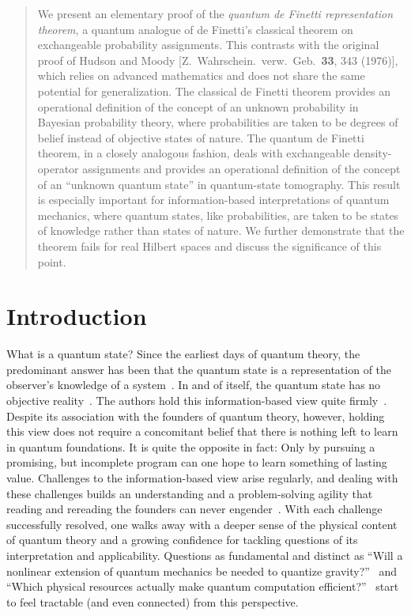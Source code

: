 \begin{abstract}
We present an elementary proof of the {\it quantum de Finetti
representation theorem}, a quantum analogue of de Finetti's
classical theorem on exchangeable probability assignments.  This
contrasts with the original proof of Hudson and Moody [Z.\
Wahrschein.\ verw.\ Geb.\ {\bf 33}, 343 (1976)], which relies on
advanced mathematics and does not share the same potential for
generalization.  The classical de Finetti theorem provides an
operational definition of the concept of an unknown probability in
Bayesian probability theory, where probabilities are taken to be
degrees of belief instead of objective states of nature.  The
quantum de Finetti theorem, in a closely analogous fashion, deals
with exchangeable density-operator assignments and provides an
operational definition of the concept of an ``unknown quantum
state'' in quantum-state tomography.  This result is especially
important for information-based interpretations of quantum
mechanics, where quantum states, like probabilities, are taken to
be states of knowledge rather than states of nature.  We further
demonstrate that the theorem fails for real Hilbert spaces and
discuss the significance of this point.
\end{abstract}


\section{Introduction} \label{sec-intro}

What is a quantum state?  Since the earliest days of quantum theory,
the predominant answer has been that the quantum state is a
representation of the observer's knowledge of a
system~\cite{Bohr1928}.  In and of itself, the quantum state has no
objective reality~\cite{Fuchs2000}.  The authors hold this
information-based view quite firmly~\cite{Caves1996,Caves1997}.
Despite its association with the founders of quantum theory,
however, holding this view does not require a concomitant belief
that there is nothing left to learn in quantum foundations. It is
quite the opposite in fact: Only by pursuing a promising, but
incomplete program can one hope to learn something of lasting value.
Challenges to the information-based view arise regularly, and
dealing with these challenges builds an understanding and a
problem-solving agility that reading and rereading the founders can
never engender~\cite{Faye1994}. With each challenge successfully
resolved, one walks away with a deeper sense of the physical content
of quantum theory and a growing confidence for tackling questions of
its interpretation and applicability. Questions as fundamental and
distinct as ``Will a nonlinear extension of quantum mechanics be
needed to quantize gravity?''~\cite{tHooft1999,Jozsa1998} and
``Which physical resources actually make quantum computation
efficient?''~\cite{Schack1999,Ambainis2000} start to feel tractable
(and even connected) from this perspective.

